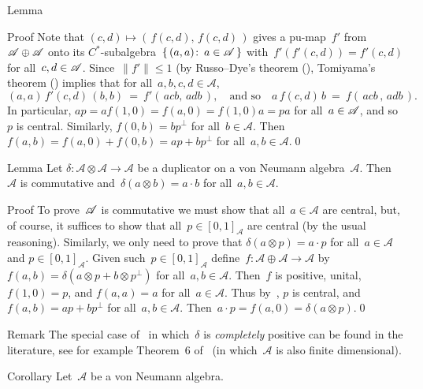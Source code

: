 \documentclass[a]{subfiles}
\begin{document}
\begin{parsec}
\begin{point}{Lemma}
\begin{point}{Proof}
Note that $(c,d)\mapsto (\,f(c,d),\,f(c,d)\,)$
gives a pu-map~$f'$ from~$\mathscr{A}\oplus \mathscr{A}$
onto its $C^*$-subalgebra~$\{\,(a,a)\colon\,a\in\mathscr{A}\,\}$
with~$f'(f'(c,d))=f'(c,d)$ for all~$c,d\in\mathscr{A}$.
Since~$\|f'\|\leq 1$ (by Russo--Dye's theorem (),
Tomiyama's theorem () 
implies that 
for all~$a,b,c,d\in\mathscr{A}$,
\begin{equation*}
	(a,a)\,f'(c,d)\,(b,b)
	\ =\  f'(\,acb,\, adb\,),
	\quad\text{and so}\quad
a \,f(c,d)\, b \ = \ f(\,acb\,,\,adb\,).
\end{equation*}
In particular,
 $ap=af(1,0)=f(a,0)=f(1,0)a=pa$
 for all~$a\in\mathscr{A}$,
and so~$p$ is central.
Similarly, $f(0,b)=bp^\perp$
for all~$b\in\mathscr{A}$.
Then~$f(a,b)=f(a,0)+f(0,b)=ap+bp^\perp$
for all~$a,b\in\mathscr{A}$.\qed
\end{point}
\end{point}
\begin{point}{Lemma}%
Let $\delta\colon\mathscr{A}\otimes \mathscr{A}\to\mathscr{A}$
be a duplicator on a von Neumann algebra~$\mathscr{A}$.
Then~$\mathscr{A}$ is commutative and~$\delta(a\otimes b)=a\cdot b$
for all~$a,b\in\mathscr{A}$.
\begin{point}{Proof}%
To prove~$\mathscr{A}$ is commutative
we must show that all~$a\in\mathscr{A}$ are central,
but, of course,
it suffices
to show that all~$p\in [0,1]_\mathscr{A}$ are central
(by the usual reasoning).
Similarly, 
we only need to prove that $\delta(a\otimes p) = a\cdot p$
for all~$a\in\mathscr{A}$ and $p\in [0,1]_\mathscr{A}$.
Given such~$p\in[0,1]_\mathscr{A}$ 
define~$f\colon \mathscr{A}\oplus\mathscr{A}\to\mathscr{A}$
by $f(a,b) = \delta(a\otimes p+b\otimes p^\perp)$
for all~$a,b\in\mathscr{A}$.
Then~$f$ is positive, unital,
$f(1,0)=p$,
and 
$f(a,a)=a$
for all~$a\in \mathscr{A}$.
Thus by~,
$p$ is central,
and  $f(a,b)=ap+bp^\perp$ for all~$a,b\in\mathscr{A}$.
Then~$a\cdot p=f(a,0)=\delta(a \otimes p)$.\qed
\end{point}
\end{point}
\begin{point}{Remark}%
The special
case of~
in which~$\delta$ is \emph{completely} positive
can be found
in the literature,
see for example
Theorem~6 of~\cite{Maassen2010}
(in which~$\mathscr{A}$ is also finite dimensional).
\end{point}
\begin{point}{Corollary}
Let~$\mathscr{A}$
be a von Neumann algebra.

\end{point}
\end{parsec}
\end{document}
